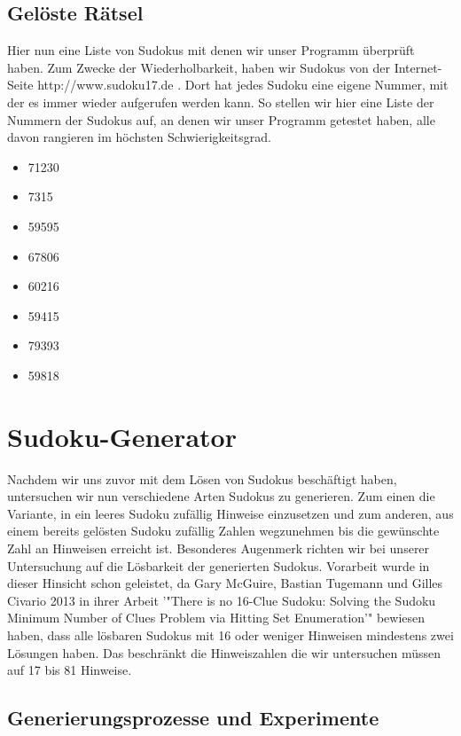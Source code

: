 \documentclass[11pt,a4paper]{article}
\begin{document}
\subsection{Gelöste Rätsel}
Hier nun eine Liste von Sudokus mit denen wir unser Programm  überprüft haben. Zum Zwecke der Wiederholbarkeit, haben wir Sudokus von der Internet-Seite http://www.sudoku17.de . Dort hat jedes Sudoku eine eigene Nummer, mit der es immer wieder aufgerufen werden kann. So stellen wir hier eine Liste der Nummern der Sudokus auf, an denen wir unser Programm getestet haben, alle davon rangieren im höchsten Schwierigkeitsgrad.
\begin{itemize}
\item 71230
\item 7315
\item 59595
\item 67806
\item 60216
\item 59415
\item 79393
\item 59818
\end{itemize}
\newpage

\section{Sudoku-Generator}
Nachdem wir uns zuvor mit dem Lösen von Sudokus beschäftigt haben,  untersuchen wir nun verschiedene Arten Sudokus zu generieren. Zum einen die Variante, in ein leeres Sudoku zufällig Hinweise einzusetzen und zum anderen, aus einem bereits gelösten Sudoku zufällig Zahlen wegzunehmen bis die gewünschte Zahl an Hinweisen erreicht ist. Besonderes Augenmerk richten wir bei unserer Untersuchung auf die Lösbarkeit der generierten Sudokus. Vorarbeit wurde in dieser Hinsicht schon geleistet, da Gary McGuire, Bastian Tugemann und Gilles Civario 2013 in ihrer Arbeit '"There is no 16-Clue Sudoku: Solving the Sudoku Minimum Number of Clues Problem via Hitting Set Enumeration'" bewiesen haben, dass alle lösbaren Sudokus mit 16 oder weniger Hinweisen mindestens zwei Lösungen haben. Das beschränkt die Hinweiszahlen die wir untersuchen müssen auf 17 bis 81 Hinweise.

\subsection{Generierungsprozesse und Experimente}
\end{document}
